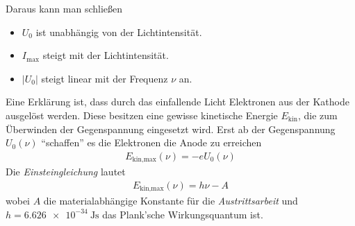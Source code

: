 Daraus kann man schließen
\begin{itemize}
\item $U_0$ ist unabhängig von der Lichtintensität.
\item $I_\text{max}$ steigt mit der Lichtintensität.
\item $|U_0|$ steigt linear mit der Frequenz $\nu$ an.
\end{itemize}
Eine Erklärung ist, dass durch das einfallende Licht Elektronen aus
der Kathode ausgelöst werden. Diese besitzen eine gewisse kinetische
Energie $E_\text{kin}$, die zum Überwinden der Gegenspannung
eingesetzt wird.
Erst ab der Gegenspannung $U_0(\nu)$ \enquote{schaffen} es die
Elektronen die Anode zu erreichen
\begin{gather*}
  E_{\text{kin,max}}(\nu) = -e U_0(\nu)
\end{gather*}
Die \emph{Einsteingleichung} lautet
\begin{gather*}
    E_{\text{kin,max}}(\nu) = h\nu - A
\end{gather*}
wobei 
$A$ 
die materialabhängige Konstante für die \emph{Austrittsarbeit} und
$h=\SI{6.626e-34}{\J\s}$%
das Plank'sche Wirkungsquantum ist.


